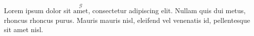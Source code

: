 \documentclass{article}
\begin{document}
Lorem ipsum dolor sit $\overset{\mathcal{ {\displaystyle G} }}{\text{amet}}$, consectetur adipiscing elit.
Nullam quis dui metus, rhoncus rhoncus purus. Mauris mauris nisl,
eleifend vel venenatis id, pellentesque sit amet nisl.
\end{document}
